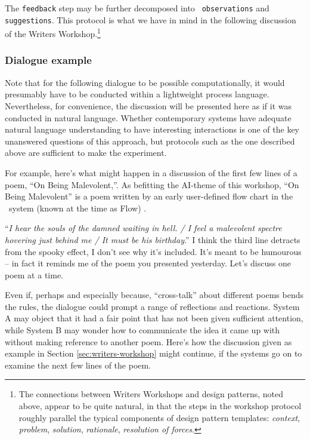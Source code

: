 The {\tt feedback} step may be further decomposed into {\tt
  observations} and {\tt suggestions}.  This protocol is what we have
in mind in the following discussion of the Writers
Workshop.\footnote{The connections between Writers Workshops and
  design patterns, noted above, appear to be quite natural, in that
  the steps in the workshop protocol roughly parallel the typical
  components of design pattern templates: \emph{context},
  \emph{problem}, \emph{solution}, \emph{rationale}, \emph{resolution
    of forces}.}

\subsubsection{Dialogue example} \label{sec:dialogue-example}
Note that for the following dialogue to be possible computationally,
it would presumably have to be conducted within a lightweight process
language.  Nevertheless, for convenience, the discussion will be
presented here as if it was conducted in natural language.  Whether
contemporary systems have adequate natural language understanding to
have interesting interactions is one of the key unanswered questions
of this approach, but protocols such as the one described above are sufficient to make the experiment.

For example, here's what might happen in a discussion of the first few
lines of a poem, ``On Being Malevolent,''. As befitting the AI-theme
of this workshop, ``On Being Malevolent'' is a poem written by an
early user-defined flow chart in the \Fw\ system (known at the time as
{\sf Flow}) \cite{colton-flowcharting}.

\begin{center}
\begin{minipage}{.9\columnwidth}
\begin{dialogue}
 ``\emph{I hear the souls of the
  damned waiting in hell. / I feel a malevolent
  spectre hovering just behind me / It must be
  his birthday}.''
%
 I think the third line detracts
from the spooky effect, I don't see why it's
included.
%
 It's meant to be humourous -- in fact it reminds me
of the poem you presented yesterday.
%
 Let's discuss one poem at a
time.
\end{dialogue}
\end{minipage}
\end{center}

Even if, perhaps and especially because, ``cross-talk'' about
different poems bends the rules, the dialogue could prompt a range of
reflections and reactions.  System A may object that it had a fair
point that has not been given sufficient attention, while System B may
wonder how to communicate the idea it came up with without making
reference to another poem.  Here's how the discussion given as example
in Section \ref{sec:writers-workshop} might continue, if the systems
go on to examine the next few lines of the poem.

